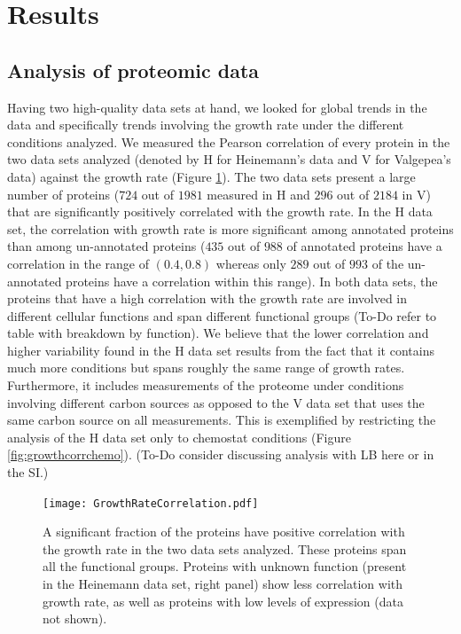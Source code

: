 \documentclass[notitlepage]{article}
\begin{document}
\section{Results}
\subsection{Analysis of proteomic data}
Having two high-quality data sets at hand, we looked for global trends in the data and specifically trends involving the growth rate under the different conditions analyzed.
We measured the Pearson correlation of every protein in the two data sets analyzed (denoted by H for Heinemann's data and V for Valgepea's data) against the growth rate (Figure \ref{fig:growthcorr}).
The two data sets present a large number of proteins ($724$ out of $1981$ measured in H and $296$ out of $2184$ in V) that are significantly positively correlated with the growth rate.
In the H data set, the correlation with growth rate is more significant among annotated proteins than among un-annotated proteins ($435$ out of $988$ of annotated proteins have a correlation in the range of $(0.4,0.8)$ whereas only $289$ out of $993$ of the un-annotated proteins have a correlation within this range).
In both data sets, the proteins that have a high correlation with the growth rate are involved in different cellular functions and span different functional groups (To-Do refer to table with breakdown by function).
We believe that the lower correlation and higher variability found in the H data set results from the fact that it contains much more conditions but spans roughly the same range of growth rates.
Furthermore, it includes measurements of the proteome under conditions involving different carbon sources as opposed to the V data set that uses the same carbon source on all measurements.
This is exemplified by restricting the analysis of the H data set only to chemostat conditions (Figure \ref{fig:growthcorrchemo}).
(To-Do consider discussing analysis with LB here or in the SI.)

\begin{figure}[h]
\centering
\texttt{[image: GrowthRateCorrelation.pdf]}
\caption{
A significant fraction of the proteins have positive correlation with the growth rate in the two data sets analyzed.
These proteins span all the functional groups.
Proteins with unknown function (present in the Heinemann data set, right panel) show less correlation with growth rate, as well as proteins with low levels of expression (data not shown).
}
\label{fig:growthcorr}
\end{figure}
\end{document}
